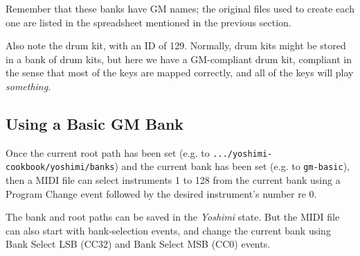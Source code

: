    Remember that these banks have GM names; the original files used to
   create each one are listed in the spreadsheet mentioned in the previous
   section.

   Also note the drum kit, with an ID of 129.  Normally, drum kits might be
   stored in a bank of drum kits, but here we have a GM-compliant drum kit,
   compliant in the sense that most of the keys are mapped correctly, and
   all of the keys will play \textsl{something}.

\subsection{Using a Basic GM Bank}
\label{subsec:cookbook_banks_using_basic_bank}

   Once the current root path has been set (e.g. to
   \texttt{.../yoshimi-cookbook/yoshimi/banks}) and
   the current bank has been set (e.g. to \texttt{gm-basic}),
   then a MIDI file can select instruments 1 to 128 from the
   current bank using a Program Change event followed by the desired
   instrument's number re 0.

   The bank and root paths can be saved in the \textsl{Yoshimi} state.
   But the MIDI file can also start with bank-selection events, and change
   the current bank using Bank Select LSB (CC32) and Bank Select MSB (CC0)
   events.

